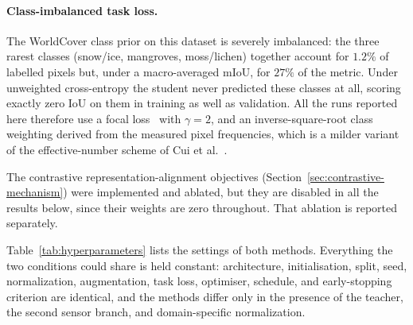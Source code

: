 \paragraph{Class-imbalanced task loss.}
The WorldCover class prior on this dataset is severely imbalanced: the three rarest classes (snow/ice, mangroves, moss/lichen) together account for $1.2\%$ of labelled pixels but, under a macro-averaged mIoU, for $27\%$ of the metric.
Under unweighted cross-entropy the student never predicted these classes at all, scoring exactly zero IoU on them in training as well as validation.
All the runs reported here therefore use a focal loss~\cite{lin2017focal} with $\gamma = 2$, and an inverse-square-root class weighting derived from the measured pixel frequencies, which is a milder variant of the effective-number scheme of Cui et al.~\cite{cui2019classbalanced}.

The contrastive representation-alignment objectives (Section~\ref{sec:contrastive-mechanism}) were implemented and ablated, but they are disabled in all the results below, since their weights are zero throughout.
That ablation is reported separately.

Table~\ref{tab:hyperparameters} lists the settings of both methods.
Everything the two conditions could share is held constant: architecture, initialisation, split, seed, normalization, augmentation, task loss, optimiser, schedule, and early-stopping criterion are identical, and the methods differ only in the presence of the teacher, the second sensor branch, and domain-specific normalization.

